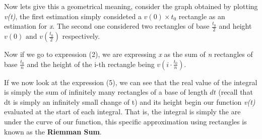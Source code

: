 \documentclass[11pt]{article}
\begin{document}
Now lets give this a geometrical meaning, consider the graph obtained by
plotting \emph{v(t)}, the first estimation simply consideted a \(v(0) \times t_{0}\)
rectangle as an estimation for \emph{x}. The second one considered two rectangles of
base \(\frac{t_{0}}{2}\) and height \(v(0) \text{ and } v(\frac{t_0}{2})\)
respectively. 

Now if we go to expression (2), we are expressing \emph{x} as the sum of \emph{n}
rectangles of base \(\frac{t_0}{n}\) and the height of the i-th rectangle being
\(v(i\cdot\frac{t_{0}}{n})\).

If we now look at the expression (5), we can see that the real value of the
integral is simply the sum of infinitely many rectangles of a base of length
\(dt\) (recall that dt is simply an infinitely small change of t) and its height begin our function \emph{v(t)} evaluated at the start of each
integral. That is, the integral is simply the are under the curve of our
function, this specific approximation using rectangles is known as the \textbf{Riemman Sum}.
\end{document}
